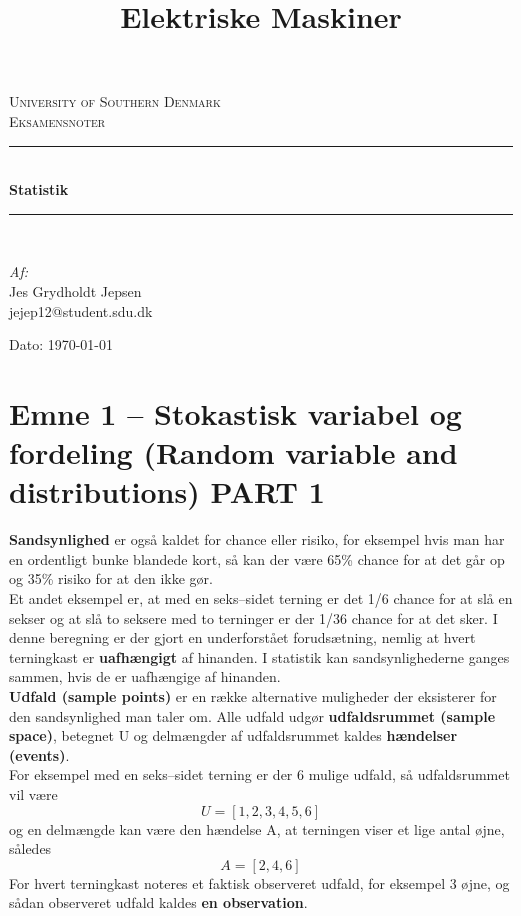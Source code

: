 \documentclass[11pt]{article}
\title{Elektriske Maskiner}
\begin{document}
\begin{titlepage}
\begin{center}


\textsc{\LARGE University of Southern Denmark}\\[1.5cm]
\textsc{\Large Eksamensnoter}\\[0.5cm]
\vfill
\hrule ~\\[0.3cm]
{ \huge \bfseries Statistik\\[0.4cm] }
\hrule ~\\[1.5cm]
\vfill

\begin{minipage}[t]{7.9cm}
\begin{flushleft} \large
\emph{Af:}\\
Jes Grydholdt Jepsen  \\
jejep12@student.sdu.dk
\end{flushleft}
\end{minipage}
\begin{minipage}[t]{7.9cm}
\begin{flushright} \large

\end{flushright}
\end{minipage}

\vspace{1.2cm}
Dato: \today


\end{center}
\end{titlepage}

\tableofcontents

\newpage
\section{Emne 1 -- Stokastisk variabel og fordeling (Random variable and distributions) PART 1}
\textbf{Sandsynlighed} er også kaldet for chance eller risiko, for eksempel hvis man har en ordentligt bunke blandede kort, så kan der være 65\% chance for at det går op og 35\% risiko for at den ikke gør.\\[0.2cm]
Et andet eksempel er, at med en seks--sidet terning er det 1/6 chance for at slå en sekser og at slå to seksere med to terninger er der 1/36 chance for at det sker. I denne beregning er der gjort en underforstået forudsætning, nemlig at hvert terningkast er \textbf{uafhængigt} af hinanden. I statistik kan sandsynlighederne ganges sammen, hvis de er uafhængige af hinanden.\\[0.2cm]
\textbf{Udfald (sample points)} er en række alternative muligheder der eksisterer for den sandsynlighed man taler om. Alle udfald udgør \textbf{udfaldsrummet (sample space)}, betegnet U og delmængder af udfaldsrummet kaldes \textbf{hændelser (events)}.\\[0.2cm]
For eksempel med en seks--sidet terning er der 6 mulige udfald, så udfaldsrummet vil være
$$U=[1,2,3,4,5,6]$$
og en delmængde kan være den hændelse A, at terningen viser et lige antal øjne, således
$$A=[2,4,6]$$
For hvert terningkast noteres et faktisk observeret udfald, for eksempel 3 øjne, og sådan observeret udfald kaldes \textbf{en observation}.
\end{document}
